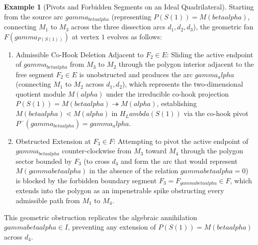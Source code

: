 \documentclass[11pt,a4paper,reqno]{amsart}
\def\mathcal#1{#1}%
\def\forb{F}%
\def\gamma{gamma}%
\def\alpha{alpha}%
\def\beta{beta}%
\def\Lambda{Lambda}%
\def\textbf#1{#1}%
\theoremstyle{definition}
\newtheorem{example}[theorem]{Example}
\theoremstyle{remark}
\newcommand{\forb}{\mathfrak{F}}
\begin{document}
\begin{example}[Pivots and Forbidden Segments on an Ideal Quadrilateral]
Starting from the source arc $\gamma_{\beta\alpha}$ (representing $P(S(1)) = M(\beta\alpha)$, connecting $M_1$ to $M_3$ across the three dissection arcs $d_1, d_2, d_3$), the geometric fan $\mathcal{F}(\gamma_{P(S(1))})$ at vertex $1$ evolves as follows:
\begin{enumerate}
    \item \textbf{Admissible Co-Hook Deletion Adjacent to $F_2 \in \mathcal{E}$:} Sliding the active endpoint of $\gamma_{\beta\alpha}$ from $M_3$ to $M_2$ through the polygon interior adjacent to the free segment $F_2 \in \mathcal{E}$ is unobstructed and produces the arc $\gamma_\alpha$ (connecting $M_1$ to $M_2$ across $d_1, d_2$), which represents the two-dimensional quotient module $M(\alpha)$ under the irreducible co-hook projection $P(S(1)) = M(\beta\alpha) \twoheadrightarrow M(\alpha)$, establishing $M(\beta\alpha) \lessdot M(\alpha)$ in $H_\Lambda(S(1))$ via the co-hook pivot $P^-(\gamma_{\beta\alpha}) = \gamma_\alpha$.
    \item \textbf{Obstructed Extension at $F_3 \in \forb$:} Attempting to pivot the active endpoint of $\gamma_{\beta\alpha}$ counter-clockwise from $M_3$ toward $M_4$ through the polygon sector bounded by $F_3$ (to cross $d_4$ and form the arc that would represent $M(\gamma\beta\alpha)$ in the absence of the relation $\gamma\beta\alpha = 0$) is blocked by the forbidden boundary segment $F_3 = F_{\gamma\beta\alpha} \in \forb$, which extends into the polygon as an impenetrable spike obstructing every admissible path from $M_1$ to $M_4$.
\end{enumerate}
This geometric obstruction replicates the algebraic annihilation $\gamma\beta\alpha \in I$, preventing any extension of $P(S(1)) = M(\beta\alpha)$ across $d_4$.
\end{example}
\end{document}
